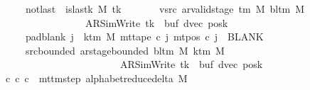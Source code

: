 \begin{isabellebody}
\ \ \ \ \ \ \ notlast{\isacharcolon}{\kern0pt}\ {\isachardoublequoteopen}{\isasymnot}\ is{\isacharunderscore}{\kern0pt}last{\isacharunderscore}{\kern0pt}k\ M\ tk{\isachardoublequoteclose}\isanewline
\ \ \ \ \ \ \ vsrc{\isacharcolon}{\kern0pt}\ {\isachardoublequoteopen}ar{\isacharunderscore}{\kern0pt}valid{\isacharunderscore}{\kern0pt}stage\ {\isacharparenleft}{\kern0pt}{\isasymGamma}{\isacharunderscore}{\kern0pt}tm\ M{\isacharparenright}{\kern0pt}\ {\isacharparenleft}{\kern0pt}bl{\isacharunderscore}{\kern0pt}tm\ M{\isacharparenright}{\kern0pt}\isanewline
\ \ \ \ \ \ \ \ \ \ \ \ \ \ \ \ \ \ \ {\isacharparenleft}{\kern0pt}AR{\isacharunderscore}{\kern0pt}SimWrite{\isacharcomma}{\kern0pt}\ tk{\isacharcomma}{\kern0pt}\ {}{\isacharcomma}{\kern0pt}\ buf{\isacharcomma}{\kern0pt}\ dvec{\isacharcomma}{\kern0pt}\ posk{\isacharparenright}{\kern0pt}{\isachardoublequoteclose}\isanewline
\ \ \ \ \ \ \ pad{\isacharunderscore}{\kern0pt}blank{\isacharcolon}{\kern0pt}\ {\isachardoublequoteopen}{\isasymforall}j\ {\isasymge}\ k{\isacharunderscore}{\kern0pt}tm\ M{\isachardot}{\kern0pt}\ mt{\isacharunderscore}{\kern0pt}tape\ c{\isacharprime}{\kern0pt}\ j\ {\isacharparenleft}{\kern0pt}mt{\isacharunderscore}{\kern0pt}pos\ c{\isacharprime}{\kern0pt}\ j{\isacharparenright}{\kern0pt}\ {\isacharequal}{\kern0pt}\ BLANK{}{\isachardoublequoteclose}\isanewline
\ \ \ \ \ \ \ src{\isacharunderscore}{\kern0pt}bounded{\isacharcolon}{\kern0pt}\ {\isachardoublequoteopen}ar{\isacharunderscore}{\kern0pt}stage{\isacharunderscore}{\kern0pt}bounded\ {\isacharparenleft}{\kern0pt}bl{\isacharunderscore}{\kern0pt}tm\ M{\isacharparenright}{\kern0pt}\ {\isacharparenleft}{\kern0pt}k{\isacharunderscore}{\kern0pt}tm\ M{\isacharparenright}{\kern0pt}\isanewline
\ \ \ \ \ \ \ \ \ \ \ \ \ \ \ \ \ \ \ \ \ \ \ \ \ \ {\isacharparenleft}{\kern0pt}AR{\isacharunderscore}{\kern0pt}SimWrite{\isacharcomma}{\kern0pt}\ tk{\isacharcomma}{\kern0pt}\ {}{\isacharcomma}{\kern0pt}\ buf{\isacharcomma}{\kern0pt}\ dvec{\isacharcomma}{\kern0pt}\ posk{\isacharparenright}{\kern0pt}{\isachardoublequoteclose}\isanewline
\ \ \ {\isachardoublequoteopen}{\isasymexists}c{\isacharprime}{\kern0pt}{\isacharprime}{\kern0pt}{\isachardot}{\kern0pt}\ {\isacharparenleft}{\kern0pt}c{\isacharprime}{\kern0pt}{\isacharcomma}{\kern0pt}\ c{\isacharprime}{\kern0pt}{\isacharprime}{\kern0pt}{\isacharparenright}{\kern0pt}\ {\isasymin}\ mttm{\isacharunderscore}{\kern0pt}step\ {\isacharparenleft}{\kern0pt}alphabet{\isacharunderscore}{\kern0pt}reduce{\isacharunderscore}{\kern0pt}delta\ M{\isacharparenright}{\kern0pt}\isanewline

\end{isabellebody}
